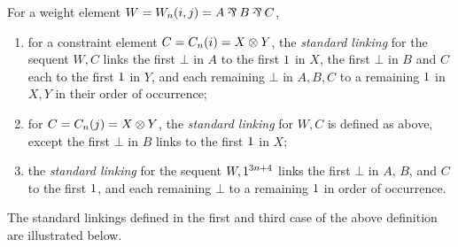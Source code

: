 \documentclass[conference]{IEEEtran}
\begin{document}
                                                                                                                                                                                                                                                                                                                                                                                                                                                                                  
\begin{definition}
\label{def:standard linkings}
For a weight element $W=W_n(i,j)=A\parr B\parr C$,
\begin{enumerate}
	\item
for a constraint element $C=C_n(i)=X\otimes Y$, the \emph{standard linking} for the sequent $W,C$ links the first $\bot$ in $A$ to the first $1$ in $X$, the first $\bot$ in $B$ and $C$ each to the first $1$ in $Y$, and each remaining $\bot$ in $A,B,C$ to a remaining $1$ in $X,Y$ in their order of occurrence;
	\item
for $C=C_n(j)=X\otimes Y$, the \emph{standard linking} for $W,C$ is defined as above, except the first $\bot$ in $B$ links to the first $1$ in $X$;
	\item
the \emph{standard linking} for the sequent $W,1^{3n+4}$ links the first $\bot$ in $A$, $B$, and $C$ to the first $1$, and each remaining $\bot$ to a remaining $1$ in order of occurrence.
\end{enumerate}
\end{definition}

The standard linkings defined in the first and third case of the above definition are illustrated below.
\end{document}
